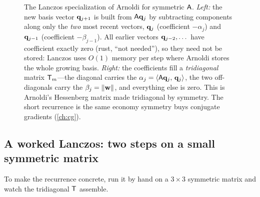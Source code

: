 \begin{figure}[t]
\caption[The Lanczos three-term recurrence and its tridiagonal matrix]{The Lanczos
specialization of Arnoldi for symmetric $\mathsf{A}$. \emph{Left:} the new basis vector
$\mathbf{q}_{j+1}$ is built from $\mathsf{A}\mathbf{q}_j$ by subtracting components along only the
\emph{two} most recent vectors, $\mathbf{q}_j$ (coefficient $-\alpha_j$) and $\mathbf{q}_{j-1}$
(coefficient $-\beta_{j-1}$). All earlier vectors $\mathbf{q}_{j-2},\dots$ have coefficient
exactly zero (rust, ``not needed''), so they need not be stored: Lanczos uses $O(1)$
memory per step where Arnoldi stores the whole growing basis. \emph{Right:} the
coefficients fill a \emph{tridiagonal} matrix $\mathsf{T}_m$---the diagonal carries the
$\alpha_j = \left\langle \mathsf{A}\mathbf{q}_j,\, \mathbf{q}_j\right\rangle$, the two off-diagonals carry the
$\beta_j = \lVert\mathbf{w}\rVert$, and everything else is zero. This is Arnoldi's Hessenberg
matrix made tridiagonal by symmetry. The short recurrence is the same economy
symmetry buys conjugate gradients (\cref{ch:cg}).}
\label{fig:lanczos}
\end{figure}

\subsection{A worked Lanczos: two steps on a small symmetric matrix}

To make the recurrence concrete, run it by hand on a $3\times 3$ symmetric matrix and
watch the tridiagonal $\mathsf{T}$ assemble.

